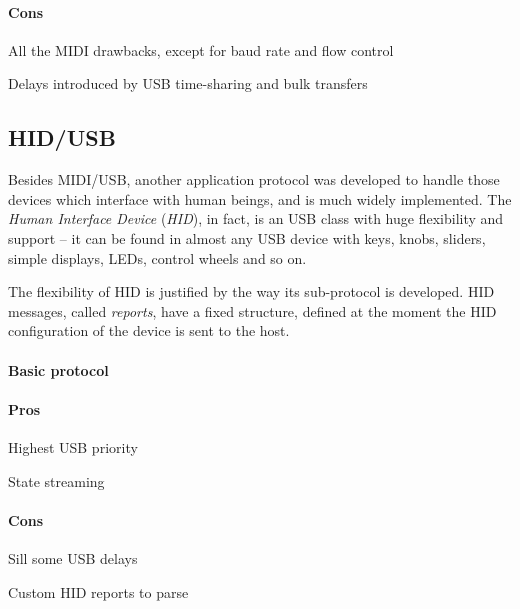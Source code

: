 \documentclass[a4paper,10pt]{article}
\begin{document}
\begin{multicols}{2}
\paragraph{Cons}
\begin{itemize*}
	\item All the MIDI drawbacks, except for baud rate and flow control
	\item Delays introduced by USB time-sharing and bulk transfers
\end{itemize*}


\subsection{HID/USB}

Besides MIDI/USB, another application protocol was developed to handle those
devices which interface with human beings, and is much widely implemented.
The \emph{Human Interface Device} (\emph{HID}), in fact, is an USB class
with huge flexibility and support -- it can be found in almost any USB device
with keys, knobs, sliders, simple displays, LEDs, control wheels and so on.

The flexibility of HID is justified by the way its sub-protocol is developed.
HID messages, called \emph{reports}, have a fixed structure, defined at the
moment the HID configuration of the device is sent to the host.

\TODO


\paragraph{Basic protocol}
\TODO


\paragraph{Pros}
\begin{itemize*}
	\item Highest USB priority
	\item State streaming
	\item \TODO
\end{itemize*}


\paragraph{Cons}
\begin{itemize*}
	\item Sill some USB delays
	\item Custom HID reports to parse
	\item \TODO
\end{itemize*}





\end{multicols}
\end{document}
